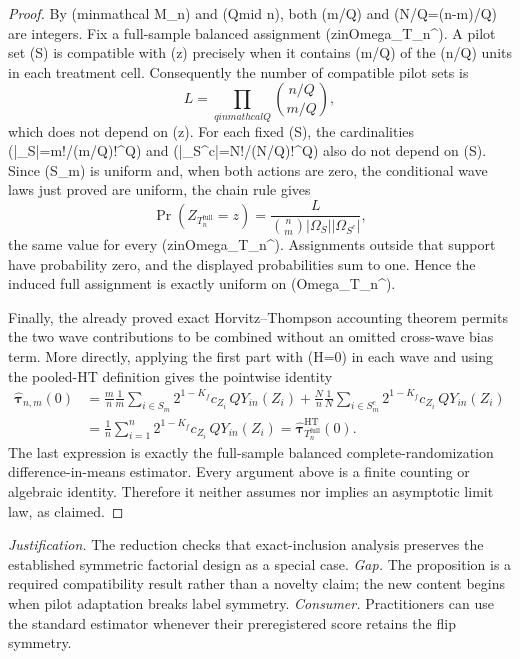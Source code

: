 \documentclass{article}
\begin{document}
\begin{proof}
By (minmathcal M\_n) and (Qmid n), both (m/Q) and (N/Q=(n-m)/Q) are integers.  Fix a full-sample balanced assignment (zinOmega\_{T\_n\textasciicircum{}{}}).  A pilot set (S) is compatible with (z) precisely when it contains (m/Q) of the (n/Q) units in each treatment cell.  Consequently the number of compatible pilot sets is
\[
L=\prod_{qinmathcal Q}{n/Q\choose m/Q},
\]
which does not depend on (z).  For each fixed (S), the cardinalities (|\Omega\_S|=m!/(m/Q)!\textasciicircum{}Q) and (|\Omega\_{S\textasciicircum{}c}|=N!/(N/Q)!\textasciicircum{}Q) also do not depend on (S).  Since (S\_m) is uniform and, when both actions are zero, the conditional wave laws just proved are uniform, the chain rule gives
\[
\Pr(Z_{T_n^{\mathrm{full}}}=z)
=\frac{L}{{n\choose m}|\Omega_S||\Omega_{S^c}|},
\]
the same value for every (zinOmega\_{T\_n\textasciicircum{}{}}).  Assignments outside that support have probability zero, and the displayed probabilities sum to one.  Hence the induced full assignment is exactly uniform on (Omega\_{T\_n\textasciicircum{}{}}).

Finally, the already proved exact Horvitz--Thompson accounting theorem permits the two wave contributions to be combined without an omitted cross-wave bias term.  More directly, applying the first part with (H=0) in each wave and using the pooled-HT definition gives the pointwise identity
\[
\begin{aligned}
\widehat{\boldsymbol\tau}_{n,m}(0)
&=\frac mn\frac1m\sum_{i\in S_m}2^{1-K_f}c_{Z_i}\,QY_{in}(Z_i)
 +\frac Nn\frac1N\sum_{i\in S_m^c}2^{1-K_f}c_{Z_i}\,QY_{in}(Z_i)\\
&=\frac1n\sum_{i=1}^n2^{1-K_f}c_{Z_i}\,QY_{in}(Z_i)
=\widehat{\boldsymbol\tau}^{\mathrm{HT}}_{T_n^{\mathrm{full}}}(0).
\end{aligned}
\]
The last expression is exactly the full-sample balanced complete-randomization difference-in-means estimator.  Every argument above is a finite counting or algebraic identity.  Therefore it neither assumes nor implies an asymptotic limit law, as claimed.
\end{proof}
\par\smallskip\noindent \textit{Justification.} The reduction checks that exact-inclusion analysis preserves the established symmetric factorial design as a special case. \textit{Gap.} The proposition is a required compatibility result rather than a novelty claim; the new content begins when pilot adaptation breaks label symmetry. \textit{Consumer.} Practitioners can use the standard estimator whenever their preregistered score retains the flip symmetry.
\end{document}

